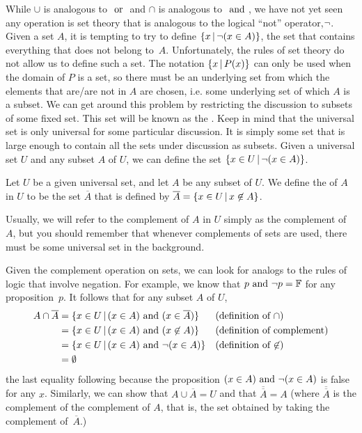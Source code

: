 \medbreak

While $\cup$ is analogous to $\text{ or }$ and $\cap$ is analogous to
$\text{ and }$, we have not yet seen any operation is set theory that
is analogous to the logical ``not'' operator,$\lnot$.  Given a
set $A$, it is tempting to try to define $\{x\,|\, \lnot(x\in A)\}$,
the set that contains everything that does not belong to~$A$. 
Unfortunately, the rules of set theory do not allow us to define 
such a set.  The notation $\{x\,|\, P(x)\}$ can only be used when
the domain of $P$ is a set, so there must be an underlying
set from which the elements that are/are not in $A$ are chosen,
i.e. some underlying set of which $A$ is a subset.  We can get around
this problem by restricting the discussion to subsets of
some fixed set.  This set will be known as the .
Keep in mind that the universal set is only universal for some
particular discussion.  It is simply some set that is large 
enough to contain all the sets under discussion as subsets.
Given a universal set $U$ and any subset $A$ of $U$,
we can define the set $\{x\in U\,|\, \lnot(x\in A)\}$.

\begin{definition}
Let $U$ be a given universal set, and let $A$ be any subset
of $U$.  We define the  of $A$ in $U$ to be the
set $\overline{A}$ that is defined by $\overline{A}=\{x\in U\,|\, x\not\in A\}$.
\end{definition}

Usually, we will refer to the complement of $A$ in $U$ simply as
the complement of $A$, but you should remember that whenever complements
of sets are used, there must be some universal set in the background.

Given the complement operation on sets, we can look for
analogs to the rules of logic that involve negation.
For example, we know that $p\text{ and }\lnot p=\mathbb{F}$ for any
proposition~$p$.  It follows that for any subset $A$ of $U$,
\begin{align*}
A\cap\overline{A} &= \{x\in U\,|\, (x\in A)\text{ and } (x\in \overline{A})\}
                        &&\text{(definition of $\cap$)}\\
                  &= \{x\in U\,|\, (x\in A)\text{ and } (x\not\in A)\}
                        &&\text{(definition of complement)}\\
                  &= \{x\in U\,|\, (x\in A)\text{ and } \lnot(x\in A)\}
                        &&\text{(definition of $\not\in$)}\\
                  &= \emptyset
\end{align*}
the last equality following because the proposition $(x\in A)\text{ and } \lnot(x\in A)$ is false for
any $x$.  Similarly, we can show that
$A\cup\overline{A}=U$ and that $\overline{\overline{A}}=A$
(where $\overline{\overline{A}}$ is the complement of the
complement of $A$, that is, the set obtained by taking the
complement of~$\overline{A}$.)

